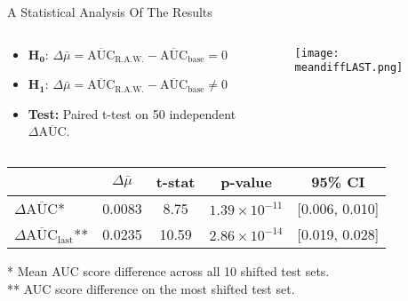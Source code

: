 \begin{frame}{A Statistical Analysis Of The Results}
    \begin{columns}[T]
        \begin{column}{0.59\textwidth}
            \vspace{1em}
            \begin{itemize}
                \item $\boldsymbol{H_0}$: $\Delta\bar{\mu} = \overline{\text{AUC}}_{\text{R.A.W.}} - \overline{\text{AUC}}_{\text{base}} = 0$ \\        
                \item $\boldsymbol{H_1}$: $\Delta\bar{\mu} = \overline{\text{AUC}}_{\text{R.A.W.}} - \overline{\text{AUC}}_{\text{base}} \neq 0$ \\
                \item \textbf{Test:} Paired t-test on 50 independent $\Delta\overline{\text{AUC}}$.
            \end{itemize}
            
        \end{column}
        
        \begin{column}{0.41\textwidth}
            \vspace{1em}
            \begin{figure}
                \centering
                \texttt{[image: meandiffLAST.png]}
            \end{figure}
        \end{column}
    \end{columns}

    \begin{table}
        \centering
        \small
        \begin{tabular}{lcccc}
            \toprule
            & $\Delta\bar{\mu}$ & t-stat & p-value & 95\% CI \\
            \midrule
            $\Delta\overline{\text{AUC}}$* & 0.0083 & 8.75  & $1.39 \times 10^{-11}$ & [0.006, 0.010] \\
            $\Delta\overline{\text{AUC}}_{\text{last}}$** & 0.0235 & 10.59 & $2.86 \times 10^{-14}$ & [0.019, 0.028] \\
            \bottomrule
        \end{tabular}
    \end{table}
    
    \begin{footnotesize}
        * Mean AUC score difference across all 10 shifted test sets. \\
        ** AUC score difference on the most shifted test set.
    \end{footnotesize}
\end{frame}


    
